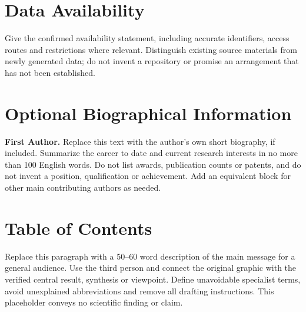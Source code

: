 \documentclass[a4paper,11pt]{article}
\begin{document}
\section*{Data Availability}
Give the confirmed availability statement, including accurate identifiers,
access routes and restrictions where relevant. Distinguish existing source
materials from newly generated data; do not invent a repository or promise
an arrangement that has not been established.




\section*{Optional Biographical Information}
\noindent
\begin{minipage}[t]{0.22\linewidth}
\vspace{0pt}\centering
{}
\end{minipage}\hfill
\begin{minipage}[t]{0.74\linewidth}
\vspace{0pt}\textbf{First Author.} Replace this text with the author's own
short biography, if included. Summarize the career to date and current
research interests in no more than 100 English words. Do not list awards,
publication counts or patents, and do not invent a position, qualification
or achievement. Add an equivalent block for other main contributing
authors as needed.
\end{minipage}
\par

\clearpage
\section*{Table of Contents}
\begin{center}
\begingroup
\setlength{\fboxsep}{0pt}
\endgroup
\end{center}
Replace this paragraph with a 50--60 word description of the main message
for a general audience. Use the third person and connect the original
graphic with the verified central result, synthesis or viewpoint. Define
unavoidable specialist terms, avoid unexplained abbreviations and remove
all drafting instructions. This placeholder conveys no scientific finding
or claim.
\end{document}
